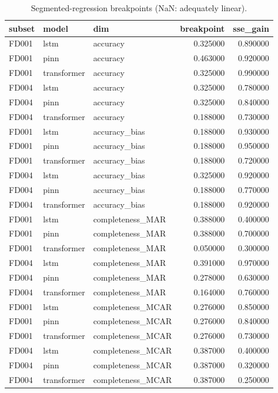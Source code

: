 \begin{table}
\caption{Segmented-regression breakpoints (NaN: adequately linear).}
\label{tab:C_breakpoints}
\begin{tabular}{lllrr}
\toprule
subset & model & dim & breakpoint & sse_gain \\
\midrule
FD001 & lstm & accuracy & 0.325000 & 0.890000 \\
FD001 & pinn & accuracy & 0.463000 & 0.920000 \\
FD001 & transformer & accuracy & 0.325000 & 0.990000 \\
FD004 & lstm & accuracy & 0.325000 & 0.780000 \\
FD004 & pinn & accuracy & 0.325000 & 0.840000 \\
FD004 & transformer & accuracy & 0.188000 & 0.730000 \\
FD001 & lstm & accuracy\_bias & 0.188000 & 0.930000 \\
FD001 & pinn & accuracy\_bias & 0.188000 & 0.950000 \\
FD001 & transformer & accuracy\_bias & 0.188000 & 0.720000 \\
FD004 & lstm & accuracy\_bias & 0.325000 & 0.920000 \\
FD004 & pinn & accuracy\_bias & 0.188000 & 0.770000 \\
FD004 & transformer & accuracy\_bias & 0.188000 & 0.920000 \\
FD001 & lstm & completeness\_MAR & 0.388000 & 0.400000 \\
FD001 & pinn & completeness\_MAR & 0.388000 & 0.700000 \\
FD001 & transformer & completeness\_MAR & 0.050000 & 0.300000 \\
FD004 & lstm & completeness\_MAR & 0.391000 & 0.970000 \\
FD004 & pinn & completeness\_MAR & 0.278000 & 0.630000 \\
FD004 & transformer & completeness\_MAR & 0.164000 & 0.760000 \\
FD001 & lstm & completeness\_MCAR & 0.276000 & 0.850000 \\
FD001 & pinn & completeness\_MCAR & 0.276000 & 0.840000 \\
FD001 & transformer & completeness\_MCAR & 0.276000 & 0.730000 \\
FD004 & lstm & completeness\_MCAR & 0.387000 & 0.400000 \\
FD004 & pinn & completeness\_MCAR & 0.387000 & 0.320000 \\
FD004 & transformer & completeness\_MCAR & 0.387000 & 0.250000 \\

\end{tabular}
\end{table}
